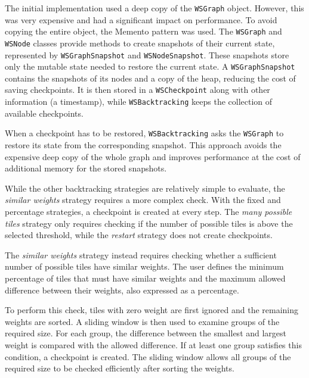 \documentclass[../../main.tex]{subfiles}
\begin{document}
The initial implementation used a deep copy of the \texttt{WSGraph} object. However, this was very expensive and had a significant impact on performance. To avoid copying the entire object, the Memento pattern was used. The \texttt{WSGraph} and \texttt{WSNode} classes provide methods to create snapshots of their current state, represented by \texttt{WSGraphSnapshot} and \texttt{WSNodeSnapshot}. These snapshots store only the mutable state needed to restore the current state. A \texttt{WSGraphSnapshot} contains the snapshots of its nodes and a copy of the heap, reducing the cost of saving checkpoints.  \clearpage  It is then stored in a \texttt{WSCheckpoint} along with other information (\eg a timestamp), while \texttt{WSBacktracking} keeps the collection of available checkpoints.

When a checkpoint has to be restored, \texttt{WSBacktracking} asks the \texttt{WSGraph} to restore its state from the corresponding snapshot. This approach avoids the expensive deep copy of the whole graph and improves performance at the cost of additional memory for the stored snapshots.

While the other backtracking strategies are relatively simple to evaluate, the \emph{similar weights} strategy requires a more complex check. With the fixed and percentage strategies, a checkpoint is created at every step. The \emph{many possible tiles} strategy only requires checking if the number of possible tiles is above the selected threshold, while the \emph{restart} strategy does not create checkpoints.

The \emph{similar weights} strategy instead requires checking whether a sufficient number of possible tiles have similar weights. The user defines the minimum percentage of tiles that must have similar weights and the maximum allowed difference between their weights, also expressed as a percentage.

To perform this check, tiles with zero weight are first ignored and the remaining weights are sorted. A sliding window is then used to examine groups of the required size. For each group, the difference between the smallest and largest weight is compared with the allowed difference. If at least one group satisfies this condition, a checkpoint is created. The sliding window allows all groups of the required size to be checked efficiently after sorting the weights.
\end{document}
